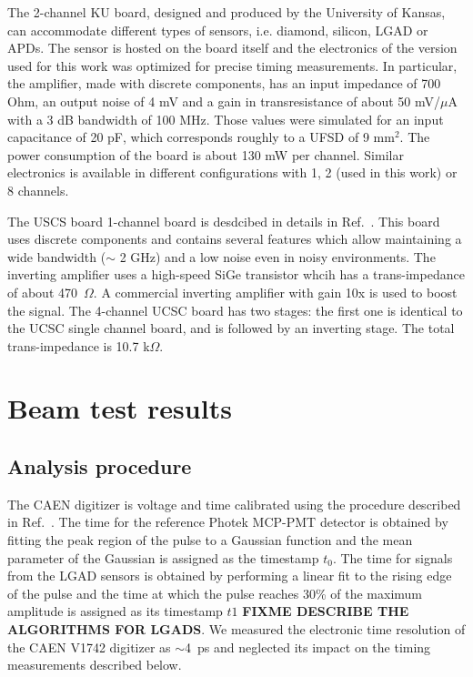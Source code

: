 \documentclass[preprint,1p]{elsarticle}
\begin{document}
The 2-channel KU board, designed and produced by the University of Kansas, can
accommodate different types of sensors, i.e. diamond, silicon, LGAD or APDs. The
sensor is hosted on the board itself and the electronics of the version used for
this work was optimized for precise timing measurements. In particular, the
amplifier, made with discrete components, has an input impedance of 700 Ohm, an
output noise of 4 mV and a gain in transresistance of about 50 mV/$\mu$A with
a 3 dB bandwidth of 100 MHz. Those values were simulated for an input
capacitance of 20 pF, which corresponds roughly to a UFSD of 9 mm$^2$. The power
consumption of the board is about 130 mW per channel. Similar electronics is
available in different configurations with 1, 2 (used in this work) or 8
channels.

The USCS board 1-channel board is desdcibed in details in
Ref.~\cite{Cartiglia201783}. This board uses discrete components and contains
several features which allow maintaining a wide bandwidth ($\sim$ 2 GHz) and a
low noise even in noisy environments. The inverting amplifier uses a high-speed
SiGe transistor whcih has a trans-impedance of about 470~$\Omega$. A commercial
inverting amplifier with gain 10x is used to boost the signal. The 4-channel
UCSC board has two stages: the first one is identical to the UCSC single channel
board, and is followed by an inverting stage. The total trans-impedance is 10.7
k$\Omega$.



\section{Beam test results}

\subsection{Analysis procedure}

The CAEN digitizer is voltage and time calibrated using the procedure described
in Ref.~\cite{Kim201467}. The time for the reference Photek MCP-PMT detector is
obtained by fitting the peak region of the pulse to a Gaussian function and the
mean parameter of the Gaussian is assigned as the timestamp $t_0$. The time for
signals from the LGAD sensors is obtained by performing a linear fit to the
rising edge of the pulse and the time at which the pulse reaches 30\% of the
maximum amplitude is assigned as its timestamp $t1$ \textbf{FIXME DESCRIBE THE
ALGORITHMS FOR LGADS}. We measured the electronic time resolution of the CAEN
V1742 digitizer as $\sim$4~ps and neglected its impact on the timing
measurements described below. 
\end{document}
